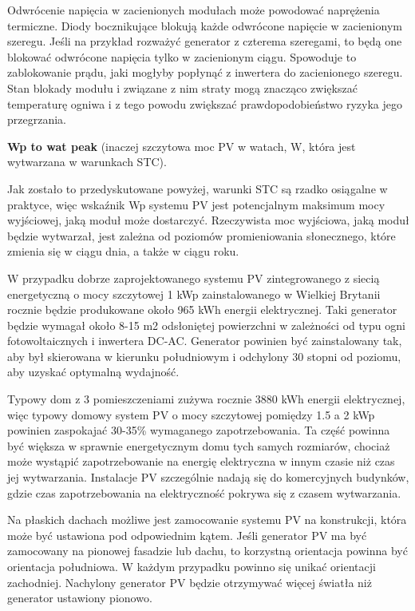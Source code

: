 \documentclass[12pt,a4paper]{article}
\begin{document}
Odwrócenie napięcia w zacienionych modułach może powodować naprężenia 
termiczne. Diody bocznikujące blokują każde odwrócone napięcie w 
zacienionym szeregu. Jeśli na przykład rozważyć generator z czterema 
szeregami, to będą one blokować odwrócone napięcia tylko w zacienionym 
ciągu. Spowoduje to zablokowanie prądu, jaki mogłyby popłynąć z 
inwertera do zacienionego szeregu. Stan blokady modułu i związane z nim 
straty mogą znacząco zwiększać temperaturę ogniwa i z tego powodu 
zwiększać prawdopodobieństwo ryzyka jego przegrzania. 

\textbf{Wp to wat peak} (inaczej szczytowa moc PV w watach, W, która 
jest wytwarzana w warunkach STC). 

Jak zostało to przedyskutowane powyżej, warunki STC są rzadko osiągalne 
w praktyce, więc wskaźnik Wp systemu PV jest potencjalnym maksimum mocy 
wyjściowej, jaką moduł może dostarczyć. Rzeczywista moc wyjściowa, jaką 
moduł będzie wytwarzał, jest zależna od poziomów promieniowania 
słonecznego, które zmienia się w ciągu dnia, a także w ciągu roku. 

W przypadku dobrze zaprojektowanego systemu PV zintegrowanego z siecią 
energetyczną o mocy szczytowej 1 kWp zainstalowanego w Wielkiej Brytanii 
rocznie będzie produkowane około 965 kWh energii elektrycznej. Taki 
generator będzie wymagał około 8-15 m2 odsłoniętej powierzchni w 
zależności od typu ogni fotowoltaicznych i inwertera DC-AC. Generator 
powinien być zainstalowany tak, aby był skierowana w kierunku 
południowym i odchylony 30 stopni od poziomu, aby uzyskać optymalną 
wydajność. 

Typowy dom z 3 pomieszczeniami zużywa rocznie 3880 kWh energii 
elektrycznej, więc typowy domowy system PV o mocy szczytowej pomiędzy 
1.5 a 2 kWp powinien zaspokajać 30-35\% wymaganego zapotrzebowania. Ta 
część powinna być większa w sprawnie energetycznym domu tych samych 
rozmiarów, chociaż może wystąpić zapotrzebowanie na energię elektryczna 
w innym czasie niż czas jej wytwarzania. Instalacje PV szczególnie 
nadają się do komercyjnych budynków, gdzie czas zapotrzebowania na 
elektryczność pokrywa się z czasem wytwarzania. 

Na płaskich dachach możliwe jest zamocowanie systemu PV na konstrukcji, 
która może być ustawiona pod odpowiednim kątem. Jeśli generator PV ma 
być zamocowany na pionowej fasadzie lub dachu, to korzystną orientacja 
powinna być orientacja południowa. W każdym przypadku powinno się unikać 
orientacji zachodniej. Nachylony generator PV będzie otrzymywać więcej 
światła niż generator ustawiony pionowo. 
\end{document}
